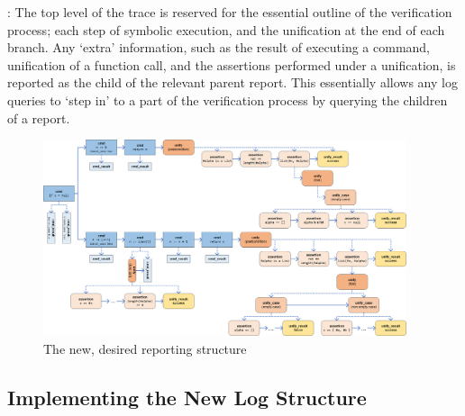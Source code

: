 :
The top level of the trace is reserved for the essential outline of the
verification process; each step of symbolic execution, and the unification at
the end of each branch. Any `extra' information, such as the result of executing
a command, unification of a function call, and the assertions performed under a
unification, is reported as the child of the relevant parent report. This
essentially allows any log queries to `step in' to a part of the verification
process by querying the children of a report.

\begin{figure}
  \center{}
  \includegraphics[width=0.95\textwidth]{img/log-structure-desired.png}
  \caption{The new, desired reporting structure}%
  \label{fig:log-structure-desired}
\end{figure}
\restoregeometry{}


\subsection{Implementing the New Log Structure}

